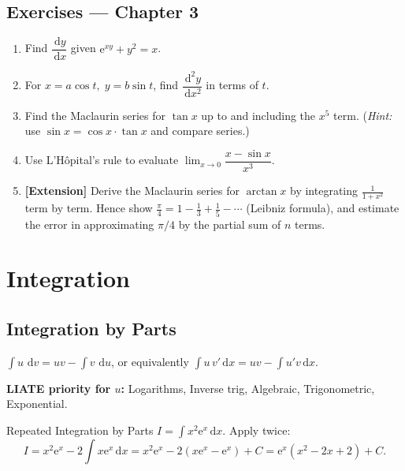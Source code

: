 \documentclass[12pt, a4paper]{book}
\newenvironment{keyresult}{%
  \begin{tcolorbox}[keystyle]%
}{%
  \end{tcolorbox}%
}
\newcommand{\dd}{\,\mathrm{d}}
\newcommand{\dx}{\,\mathrm{d}x}
\newcommand{\e}{\mathrm{e}}
\begin{document}
\section*{Exercises --- Chapter 3}
\begin{enumerate}[label=\textbf{\arabic*.}]
  \item Find $\displaystyle \dfrac{\dd y}{\dx}$ given $\displaystyle \e^{xy}+y^2=x$.
  \item For $\displaystyle x=a\cos t,\;y=b\sin t$, find $\displaystyle \dfrac{\dd^2 y}{\dx^2}$ in terms of $\displaystyle t$.
  \item Find the Maclaurin series for $\displaystyle \tan x$ up to and including the $\displaystyle x^5$ term. (\textit{Hint:} use $\displaystyle \sin x = \cos x\displaystyle \cdot\tan x$ and compare series.)
  \item Use L'H\^opital's rule to evaluate $\displaystyle \lim_{x\to 0}\dfrac{x-\sin x}{x^3}$.
  \item \textbf{[Extension]} Derive the Maclaurin series for $\displaystyle \arctan x$ by integrating $\displaystyle \frac{1}{1+x^2}$ term by term. Hence show $\displaystyle \frac{\pi}{4}=1-\frac{1}{3}+\frac{1}{5}-\cdots$ (Leibniz formula), and estimate the error in approximating $\displaystyle \pi/4$ by the partial sum of $\displaystyle n$ terms.
\end{enumerate}

\chapter{Integration}

\section{Integration by Parts}

\begin{keyresult}
$\displaystyle\int u\,\dd v = uv - \int v\,\dd u$, or equivalently $\displaystyle\int u\,v'\dx = uv - \int u'v\dx$.

\textbf{LIATE priority for $u$:} Logarithms, Inverse trig, Algebraic, Trigonometric, Exponential.
\end{keyresult}

\begin{example}{Repeated Integration by Parts}{}
$\displaystyle I=\int x^2\e^x\dx$. Apply twice:
\[
I = x^2\e^x - 2\int x\e^x\dx = x^2\e^x - 2(x\e^x-\e^x)+C = \e^x(x^2-2x+2)+C.
\]
\end{example}
\end{document}
